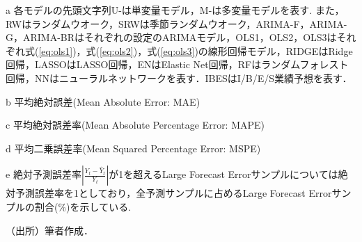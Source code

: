 \begin{threeparttable}
\begin{tablenotes}
\item[a] 各モデルの先頭文字列U-は単変量モデル，M-は多変量モデルを表す. また，RWはランダムウオーク，SRWは季節ランダムウオーク，ARIMA-F，ARIMA-G，ARIMA-BRはそれぞれ\cite*{foster1977quarterly, griffin1977time, brown1979univariate}の設定のARIMAモデル，OLS1，OLS2，OLS3はそれぞれ式(\ref{eq:ols1})，式(\ref{eq:ols2})，式(\ref{eq:ols3})の線形回帰モデル，RIDGEはRidge回帰，LASSOはLASSO回帰，ENはElastic Net回帰，RFはランダムフォレスト回帰，NNはニューラルネットワークを表す．IBESはI/B/E/S業績予想を表す．
\item[b] 平均絶対誤差(Mean Absolute Error: MAE)
\item[c] 平均絶対誤差率(Mean Absolute Percentage Error: MAPE)
\item[d] 平均二乗誤差率(Mean Squared Percentage Error: MSPE)
\item[e] 絶対予測誤差率$\left| \frac{Y_t -{\hat Y}_t}{Y_t} \right|$が1を超えるLarge Forecast Errorサンプルについては絶対予測誤差率を1としており，全予測サンプルに占めるLarge Forecast Errorサンプルの割合(\%)を示している.
\item[] （出所）筆者作成． 
\end{tablenotes}
\end{threeparttable}